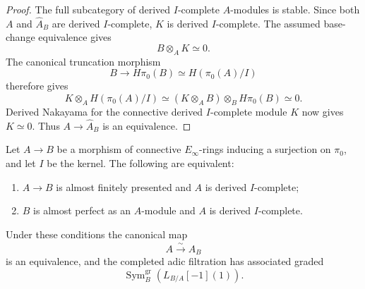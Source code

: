 \begin{proof}
The full subcategory of derived $I$-complete $A$-modules is stable.  Since
both $A$ and $\widehat A_B$ are derived $I$-complete, $K$ is derived
$I$-complete.  The assumed base-change equivalence gives
\[
    B\otimes_AK\simeq0.
\]
The canonical truncation morphism
\[
    B\longrightarrow H\pi_0(B)
    \simeq H\!\left(\pi_0(A)/I\right)
\]
therefore gives
\[
    K\otimes_AH\!\left(\pi_0(A)/I\right)
    \simeq
    (K\otimes_AB)\otimes_BH\pi_0(B)
    \simeq0.
\]
Derived Nakayama for the connective derived $I$-complete module $K$ now gives
$K\simeq0$.  Thus $A\to\widehat A_B$ is an equivalence.
\end{proof}

\begin{proposition}
\label{prop:bnla-spectral-aft-criterion}
Let $A\to B$ be a morphism of connective $E_\infty$-rings inducing a
surjection on $\pi_0$, and let $I$ be the kernel.  The following are
equivalent:
\begin{enumerate}
    \item $A\to B$ is almost finitely presented and $A$ is derived
    $I$-complete;
    \item $B$ is almost perfect as an $A$-module and $A$ is derived
    $I$-complete.
\end{enumerate}
Under these conditions the canonical map
\[
    A\xrightarrow{\sim}\widehat A_B
\]
is an equivalence, and the completed adic filtration has associated graded
\[
    \operatorname{Sym}^{\mathrm{gr}}_B(L_{B/A}[-1](1)).
\]
\end{proposition}

